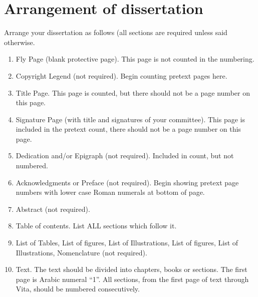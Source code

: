 \documentclass[12pt]{report} %
\theoremstyle{definition}
\theoremstyle{remark}
\begin{document}
\section{Arrangement of dissertation}
%

Arrange your dissertation as follows (all sections are required 
unless said otherwise.

\begin{enumerate}

\item Fly Page 
%
(blank protective page). This page is not 
counted in the numbering.

\item Copyright Legend 
%
(not required). Begin counting 
pretext pages here.

\item Title Page. 
%
This page is counted, but there should not 
be a page number on this page.

\item Signature Page 
%
(with title and signatures of your 
committee). This page is included in the pretext count, 
there should not be a page number on this page.

\item Dedication 
%
and/or Epigraph (not required). 
Included in count, but not numbered.

\item Acknowledgments or Preface 
%
%
(not required). Begin 
showing pretext page numbers with lower case Roman numerals 
at bottom of page.

\item Abstract 
%
(not required).

\item Table of contents. 
%
List ALL sections which follow it.

\item List of Tables, List of figures, List of Illustrations, 
%
List of figures,
%
List of Illustrations, 
% 
Nomenclature 
%
(not required).

\item Text. 
%
The text should be divided into chapters, books or 
sections. The first page is Arabic numeral ``1''. All sections,
from the first page of text through Vita, should be numbered 
consecutively.


\end{enumerate}
\end{document}
